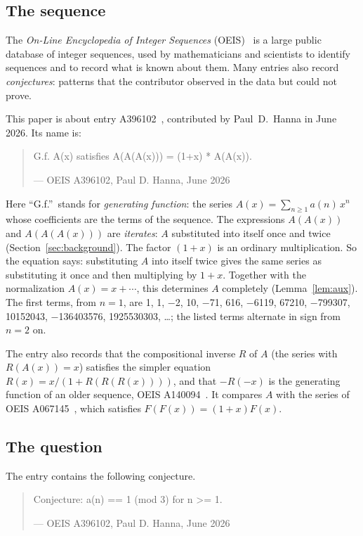 \documentclass[11pt,a4paper]{article}
\theoremstyle{definition}
\theoremstyle{remark}
\begin{document}
\subsection{The sequence}\label{sec:sequence}
The \emph{On-Line Encyclopedia of Integer Sequences} (OEIS)~\cite{oeisdb} is a large public database of integer
sequences, used by mathematicians and scientists to identify sequences and to record what is known about them. Many
entries also record \emph{conjectures}: patterns that the contributor observed in the data but could not prove.

This paper is about entry A396102~\cite{oeis}, contributed by Paul~D.~Hanna in June 2026. Its name is:
\begin{quote}\small\ttfamily\raggedright G.f. A(x) satisfies A(A(A(x))) = (1+x) * A(A(x)).\par\smallskip\hfill\textrm{--- OEIS A396102, Paul D. Hanna, June 2026}\end{quote}

Here ``G.f.''\ stands for \emph{generating function}: the series $A(x)=\sum_{n\ge1}a(n)\,x^n$ whose coefficients are
the terms of the sequence. The expressions $A(A(x))$ and $A(A(A(x)))$ are \emph{iterates}: $A$ substituted into itself
once and twice (Section~\ref{sec:background}). The factor $(1+x)$ is an ordinary multiplication. So the equation says:
substituting $A$ into itself twice gives the same series as substituting it once and then multiplying by $1+x$.
Together with the normalization $A(x)=x+\cdots$, this determines $A$ completely (Lemma~\ref{lem:aux}). The first
terms, from $n=1$, are 1, 1, $-$2, 10, $-$71, 616, $-$6119, 67210, $-$799307, 10152043, $-$136403576, 1925530303, \dots{}; the listed terms alternate in sign from $n=2$ on.

The entry also records that the compositional inverse $R$ of $A$ (the series with $R(A(x))=x$) satisfies the simpler
equation $R(x)=x/(1+R(R(R(x))))$, and that $-R(-x)$ is the generating function of an older sequence, OEIS
A140094~\cite{oeisR}. It compares $A$ with the series of OEIS A067145~\cite{oeisF2}, which satisfies $F(F(x))=(1+x)F(x)$.

\subsection{The question}
The entry contains the following conjecture.
\begin{quote}\small\ttfamily\raggedright Conjecture: a(n) == 1 (mod 3) for n >= 1.\par\smallskip\hfill\textrm{--- OEIS A396102, Paul D. Hanna, June 2026}\end{quote}
\end{document}

